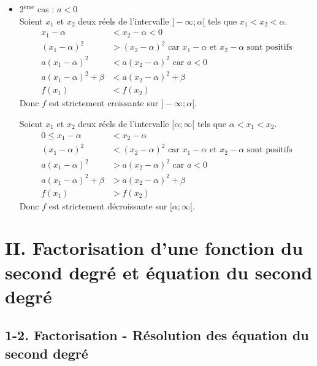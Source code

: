 \documentclass[11pt,a4paper]{article}
\begin{document}
\begin{itemize}
    \item 2$^{\text{ème}}$ cas : $a<0$ ~\\
        Soient $x_1$ et $x_2$ deux réels de l'intervalle $]-\infty;\alpha[$ tels que $x_1<x_2<\alpha$.
        \begin{align*}
            x_1-\alpha            & <  x_2-\alpha < 0                                                                    \\
            (x_1-\alpha)^2        & >  (x_2-\alpha)^2 \text{ car }x_1-\alpha \text{ et }x_2-\alpha \text{ sont positifs} \\
            a(x_1-\alpha)^2       & < a(x_2-\alpha)^2 \text{ car } a<0                                                   \\
            a(x_1-\alpha)^2+\beta & < a(x_2-\alpha)^2+\beta                                                              \\
            f(x_1)                & < f(x_2)
        \end{align*}
        Donc $f$ est strictement croissante sur $]-\infty;\alpha[$.

        Soient $x_1$ et $x_2$ deux réels de l'intervalle $[\alpha;\infty[$ tels que $\alpha<x_1<x_2$.
        \begin{align*}
            0\leq x_1-\alpha          & <  x_2-\alpha                                                                        \\
            (x_1-\alpha)^2        & <  (x_2-\alpha)^2 \text{ car }x_1-\alpha \text{ et }x_2-\alpha \text{ sont positifs} \\
            a(x_1-\alpha)^2       & > a(x_2-\alpha)^2 \text{ car } a<0                                                   \\
            a(x_1-\alpha)^2+\beta & > a(x_2-\alpha)^2+\beta                                                              \\
            f(x_1)                & > f(x_2)
        \end{align*}
        Donc $f$ est strictement décroissante sur $[\alpha;\infty[$.


\end{itemize}

\section*{II. Factorisation d'une fonction du second degré et équation du second degré}
\subsection*{1-2. Factorisation - Résolution des équation du second degré}
\end{document}
